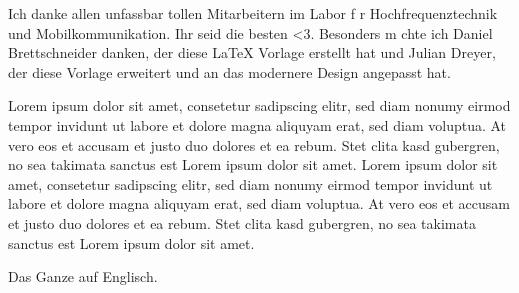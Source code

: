 \documentclass{article}
\renewcommand{\headrulewidth}{0pt}
\begin{document}
\onehalfspacing						%
\pagestyle{plain}					%
\setcounter{page}{1}				%

\label{danksagungen}
Ich danke allen unfassbar tollen Mitarbeitern im Labor f r Hochfrequenztechnik und Mobilkommunikation. Ihr seid die besten <3. Besonders m chte ich Daniel Brettschneider danken, der diese LaTeX Vorlage erstellt hat und Julian Dreyer, der diese Vorlage erweitert und an das modernere Design angepasst hat.
\pagebreak


Lorem ipsum dolor sit amet, consetetur sadipscing elitr, sed diam nonumy eirmod tempor invidunt ut labore et dolore magna aliquyam erat, sed diam voluptua. At vero eos et accusam et justo duo dolores et ea rebum. Stet clita kasd gubergren, no sea takimata sanctus est Lorem ipsum dolor sit amet. Lorem ipsum dolor sit amet, consetetur sadipscing elitr, sed diam nonumy eirmod tempor invidunt ut labore et dolore magna aliquyam erat, sed diam voluptua. At vero eos et accusam et justo duo dolores et ea rebum. Stet clita kasd gubergren, no sea takimata sanctus est Lorem ipsum dolor sit amet.

Das Ganze auf Englisch.
\pagebreak

\renewcommand{\headrulewidth}{0.2pt}
\addtocounter{section}{1}

\setcounter{tocdepth}{1}
\end{document}
